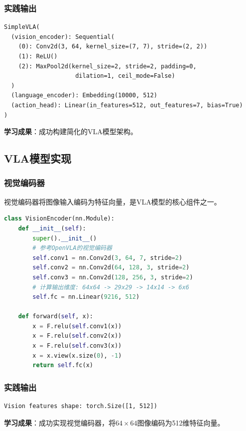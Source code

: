 \documentclass[12pt,a4paper]{article}
\begin{document}
\subsubsection{实践输出}

\begin{verbatim}
SimpleVLA(
  (vision_encoder): Sequential(
    (0): Conv2d(3, 64, kernel_size=(7, 7), stride=(2, 2))
    (1): ReLU()
    (2): MaxPool2d(kernel_size=2, stride=2, padding=0, 
                    dilation=1, ceil_mode=False)
  )
  (language_encoder): Embedding(10000, 512)
  (action_head): Linear(in_features=512, out_features=7, bias=True)
)
\end{verbatim}

\textbf{学习成果}：成功构建简化的VLA模型架构。

\subsection{VLA模型实现}

\subsubsection{视觉编码器}

视觉编码器将图像输入编码为特征向量，是VLA模型的核心组件之一。

\begin{lstlisting}[language=Python]
class VisionEncoder(nn.Module):
    def __init__(self):
        super().__init__()
        # 参考OpenVLA的视觉编码器
        self.conv1 = nn.Conv2d(3, 64, 7, stride=2)
        self.conv2 = nn.Conv2d(64, 128, 3, stride=2)
        self.conv3 = nn.Conv2d(128, 256, 3, stride=2)
        # 计算输出维度: 64x64 -> 29x29 -> 14x14 -> 6x6
        self.fc = nn.Linear(9216, 512)
    
    def forward(self, x):
        x = F.relu(self.conv1(x))
        x = F.relu(self.conv2(x))
        x = F.relu(self.conv3(x))
        x = x.view(x.size(0), -1)
        return self.fc(x)
\end{lstlisting}

\subsubsection{实践输出}

\begin{verbatim}
Vision features shape: torch.Size([1, 512])
\end{verbatim}

\textbf{学习成果}：成功实现视觉编码器，将$64 \times 64$图像编码为512维特征向量。
\end{document}
